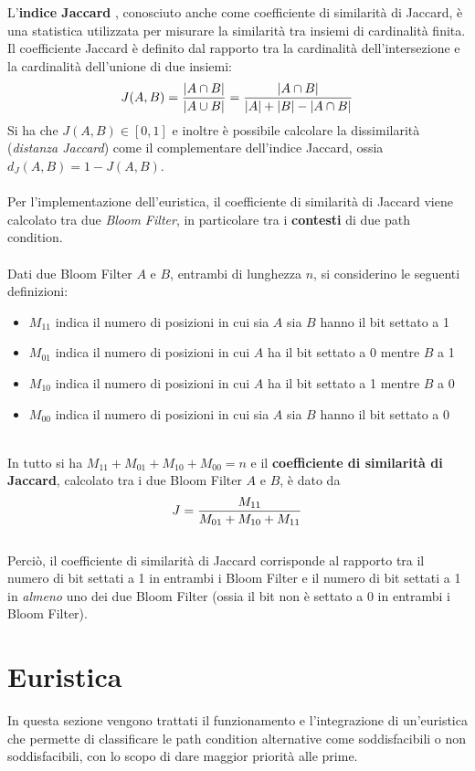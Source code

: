 \documentclass[a4paper, 12pt, oneside]{book}
\theoremstyle{normal}
\begin{document}
L'\textbf{indice Jaccard} \cite{enwiki:1156109434}, conosciuto anche come coefficiente di similarità di Jaccard, è una statistica utilizzata per misurare la similarità tra insiemi di cardinalità finita. Il coefficiente Jaccard è definito dal rapporto tra la cardinalità dell'intersezione e la cardinalità dell'unione di due insiemi: \[
J(A,B) = {{|A \cap B|}\over{|A \cup B|}} = {{|A \cap B|}\over{|A| + |B| - |A \cap B|}}
\] \clearpage \noindent Si ha che $J(A,B) \in [0, 1]$ e inoltre è possibile calcolare la dissimilarità (\emph{distanza Jaccard}) come il complementare dell'indice Jaccard, ossia $d_J(A,B) = 1 - J(A,B)$.
\\ \\ Per l'implementazione dell'euristica, il coefficiente di similarità di Jaccard viene calcolato tra due \emph{Bloom Filter}, in particolare tra i \textbf{contesti} di due path condition. \\ \\ Dati due Bloom Filter $A$ e $B$, entrambi di lunghezza $n$, si considerino le seguenti definizioni:
\begin{itemize}[label={}, itemsep=0pt, topsep=2pt]
    \item $M_{11}$ indica il numero di posizioni in cui sia $A$ sia $B$ hanno il bit settato a 1
    \item $M_{01}$ indica il numero di posizioni in cui $A$ ha il bit settato a 0 mentre $B$ a 1
    \item $M_{10}$ indica il numero di posizioni in cui $A$ ha il bit settato a 1 mentre $B$ a 0
    \item $M_{00}$ indica il numero di posizioni in cui sia $A$ sia $B$ hanno il bit settato a 0
\end{itemize}
\noindent \\ In tutto si ha $M_{11} + M_{01} + M_{10} + M_{00} = n$ e il \textbf{coefficiente di similarità di Jaccard}, calcolato tra i due Bloom Filter $A$ e $B$, è dato da \[
J = {M_{11} \over M_{01} + M_{10} + M_{11}}
\] \\
Perciò, il coefficiente di similarità di Jaccard corrisponde al rapporto tra il numero di bit settati a 1 in entrambi i Bloom Filter e il numero di bit settati a 1 in \emph{almeno} uno dei due Bloom Filter (ossia il bit non è settato a 0 in entrambi i Bloom Filter).

\clearpage
\section{Euristica}
In questa sezione vengono trattati il funzionamento e l'integrazione di un'euristica che permette di classificare le path condition alternative come soddisfacibili o non soddisfacibili, con lo scopo di dare maggior priorità alle prime.
\end{document}

